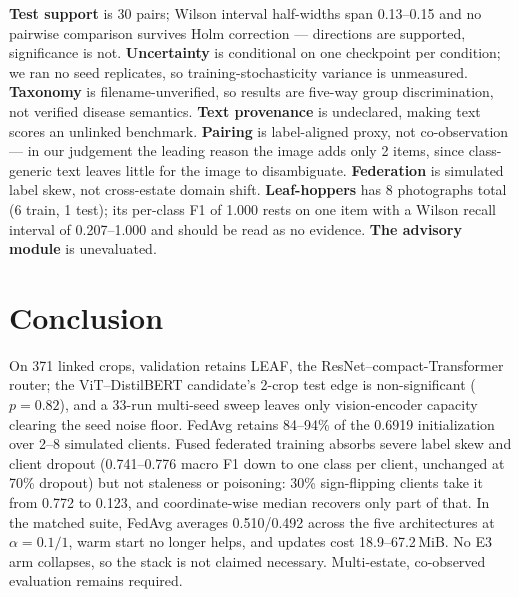 \documentclass[conference]{IEEEtran}
\begin{document}
\textbf{Test support} is 30 pairs; Wilson interval half-widths span 0.13--0.15 and no
pairwise comparison survives Holm correction --- directions are supported,
significance is not. \textbf{Uncertainty} is conditional on one checkpoint per
condition; we ran no seed replicates, so training-stochasticity variance is
unmeasured. \textbf{Taxonomy} is filename-unverified, so results are five-way
group discrimination, not verified disease semantics. \textbf{Text provenance} is
undeclared, making text scores an unlinked benchmark. \textbf{Pairing} is
label-aligned proxy, not co-observation --- in our judgement the leading reason the
image adds only 2 items, since class-generic text leaves little for the image to
disambiguate. \textbf{Federation} is simulated label skew, not cross-estate domain
shift. \textbf{Leaf-hoppers} has 8 photographs total (6 train, 1 test); its
per-class F1 of 1.000 rests on one item with a Wilson recall interval of
0.207--1.000 and should be read as no evidence. \textbf{The advisory module} is
unevaluated.

\fi
\section{Conclusion}
\label{sec:conc}

On 371 linked crops, validation retains LEAF, the ResNet--compact-Transformer router;
the ViT--DistilBERT candidate's 2-crop test edge is non-significant
($p=0.82$), and a 33-run multi-seed sweep leaves only vision-encoder
capacity clearing the seed noise floor. FedAvg retains 84--94\% of the
0.6919 initialization over 2--8 simulated clients. Fused federated training
absorbs severe label skew and client dropout (0.741--0.776 macro F1 down to one
class per client, unchanged at 70\% dropout) but not staleness or poisoning: 30\%
sign-flipping clients take it from 0.772 to 0.123, and coordinate-wise median
recovers only part of that. In the matched
suite, FedAvg averages 0.510/0.492 across the five architectures at
$\alpha=0.1/1$, warm start no longer helps, and updates cost 18.9--67.2\,MiB. No E3 arm collapses, so the stack is not claimed
necessary. Multi-estate, co-observed evaluation remains required.
\end{document}
